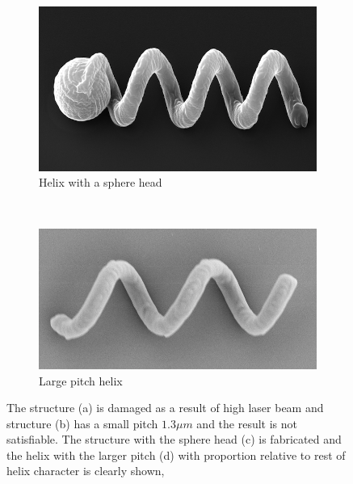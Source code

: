 \documentclass[12pt,a4paper,titlepage]{report}
\begin{document}
\begin{figure}
  \begin{subfigure}[b]{0.45\textwidth}
                \includegraphics[width=\textwidth]{sphereFabricated}
                \caption{Helix with a sphere head}
                \label{sphereFabricated}
        \end{subfigure}~
       \begin{subfigure}[b]{0.53\textwidth}
                \includegraphics[width=\textwidth]{largePitch}
                \caption{Large pitch helix}
                \label{largePitch}
        \end{subfigure}
        \caption[Fabricated structures]{The structure (a) is damaged as a result of high 
laser beam and structure (b) has a small pitch $1.3 \mu m$ and the result is not satisfiable. The structure
with the sphere head (c) is fabricated and the helix with the larger pitch (d) with proportion relative to
rest of helix character is clearly shown,}\label{Damaged structures}

       

\end{figure}
\end{document}

